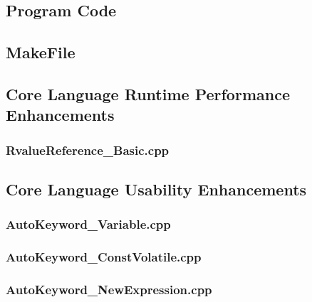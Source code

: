 \documentclass[11pt]{report}
\newcommand{\Cpp}{\lstset{language=C++,keywordstyle=\bfseries,breaklines,breakindent=30pt}}
\newcommand{\Make}{\lstset{language=make}}
\begin{document}
\begin{appendix}

\chapter{Program Code}
\label{chapter:Programcode}


\section{MakeFile}
\label{Makefile}

\Make


\newpage


\section{Core Language Runtime Performance Enhancements}
\label{Appendix: corelanguage runtime performance}

\Cpp

\subsection{RvalueReference\_Basic.cpp}
\label{sub:RvalueReference_Basic}
%


\section{Core Language Usability Enhancements}
\label{Appendix: corelanguage usabiliy enhancements}

\Cpp

\subsection{AutoKeyword\_Variable.cpp}
\label{AutoKeyword_Variable}


\subsection{AutoKeyword\_ConstVolatile.cpp}
\label{AutoKeyword_ConstVolatile}


\subsection{AutoKeyword\_NewExpression.cpp}
\label{AutoKeyword_NewExpression}



\end{appendix}
\end{document}
